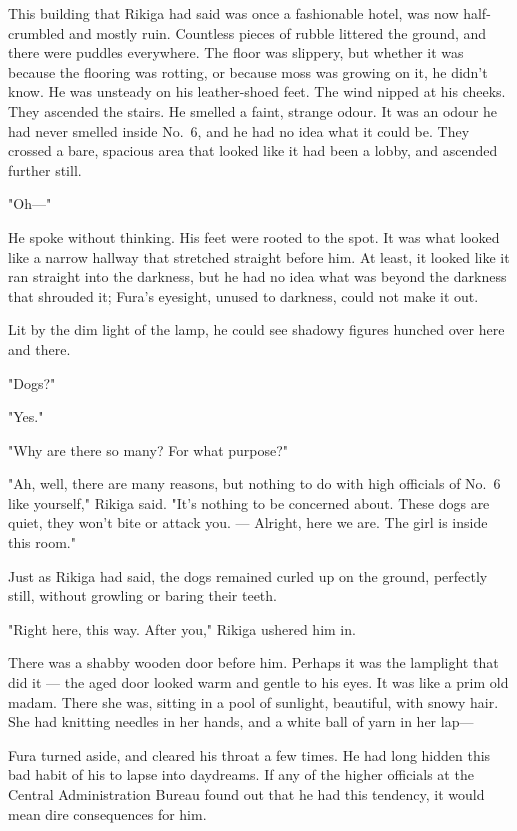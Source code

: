 This building that Rikiga had said was once a fashionable hotel, was now
half-crumbled and mostly ruin. Countless pieces of rubble littered the
ground, and there were puddles everywhere. The floor was slippery, but
whether it was because the flooring was rotting, or because moss was
growing on it, he didn't know. He was unsteady on his leather-shoed
feet. The wind nipped at his cheeks. They ascended the stairs. He
smelled a faint, strange odour. It was an odour he had never smelled
inside No.~6, and he had no idea what it could be. They crossed a bare,
spacious area that looked like it had been a lobby, and ascended further
still.

"Oh---"

He spoke without thinking. His feet were rooted to the spot. It was what
looked like a narrow hallway that stretched straight before him. At
least, it looked like it ran straight into the darkness, but he had no
idea what was beyond the darkness that shrouded it; Fura's eyesight,
unused to darkness, could not make it out.

Lit by the dim light of the lamp, he could see shadowy figures hunched
over here and there.

"Dogs?"

"Yes."

"Why are there so many? For what purpose\el ?"

"Ah, well, there are many reasons, but nothing to do with high officials
of No.~6 like yourself," Rikiga said. "It's nothing to be concerned
about. These dogs are quiet, they won't bite or attack you. --- Alright,
here we are. The girl is inside this room."

Just as Rikiga had said, the dogs remained curled up on the ground,
perfectly still, without growling or baring their teeth.

"Right here, this way. After you," Rikiga ushered him in.

There was a shabby wooden door before him. Perhaps it was the lamplight
that did it --- the aged door looked warm and gentle to his eyes. It was
like a prim old madam. There she was, sitting in a pool of sunlight,
beautiful, with snowy hair. She had knitting needles in her hands, and a
white ball of yarn in her lap---

Fura turned aside, and cleared his throat a few times. He had long
hidden this bad habit of his to lapse into daydreams. If any of the
higher officials at the Central Administration Bureau found out that he
had this tendency, it would mean dire consequences for him.

